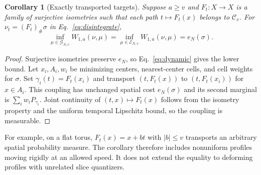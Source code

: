 \documentclass[aip,jmp,reprint,onecolumn,amsmath,amssymb]{revtex4-2}
\newcommand{\C}{\mathcal C}
\newcommand{\G}{\mathcal G}
\newcommand{\push}{\mathord\#}
\newtheorem{corollary}[theorem]{Corollary}
\theoremstyle{definition}
\begin{document}
\begin{corollary}[Exactly transported targets]
Suppose $a\ge v$ and $F_t:X\to X$ is a family of surjective isometries such that each path $t\mapsto F_t(x)$ belongs to $\C_v$. For $\nu_t=(F_t)_{\push}\sigma$ in Eq.~\eqref{eq:disintegrate},
\begin{equation}
 \inf_{\mu\in\G_{N,v}}W_{1,a}(\nu,\mu)
 =\inf_{\mu\in\mathcal E_{N,v}}W_{1,a}(\nu,\mu)=e_N(\sigma).
 \label{eq:transported}
\end{equation}
\end{corollary}
\begin{proof}
Surjective isometries preserve $e_N$, so Eq.~\eqref{eq:dynamic} gives the lower bound. Let $x_i,A_i,w_i$ be minimizing centers, nearest-center cells, and cell weights for $\sigma$. Set $\gamma_i(t)=F_t(x_i)$ and transport $(t,F_t(x))$ to $(t,F_t(x_i))$ for $x\in A_i$. This coupling has unchanged spatial cost $e_N(\sigma)$ and its second marginal is $\sum_iw_iP_{\gamma_i}$. Joint continuity of $(t,x)\mapsto F_t(x)$ follows from the isometry property and the uniform temporal Lipschitz bound, so the coupling is measurable.
\end{proof}
For example, on a flat torus, $F_t(x)=x+bt$ with $|b|\le v$ transports an arbitrary spatial probability measure. The corollary therefore includes nonuniform profiles moving rigidly at an allowed speed. It does not extend the equality to deforming profiles with unrelated slice quantizers.
\end{document}
